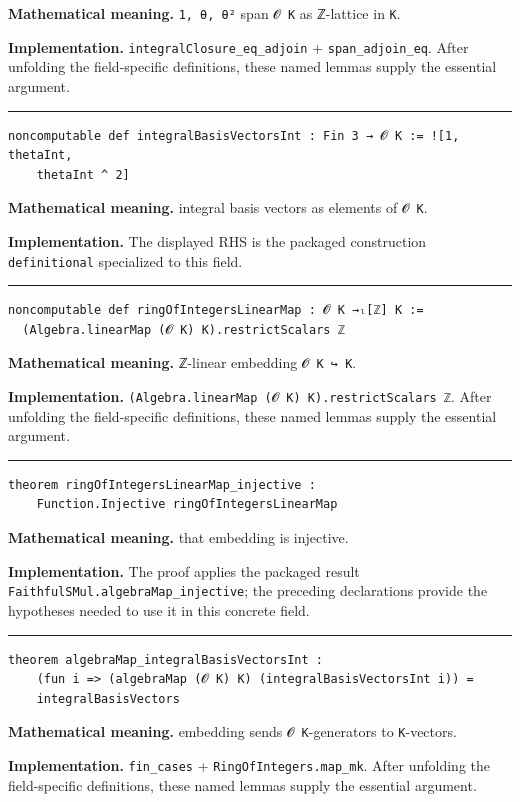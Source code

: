 \documentclass[UTF8,a4paper,11pt,fontset=fandol]{ctexart}
\theoremstyle{definition}
\newcommand{\statementsep}{\par\medskip\hrule\medskip}
\begin{document}
\noindent\textbf{Mathematical meaning.} \texttt{1, θ, θ²} span \texttt{𝓞 K} as ℤ-lattice in \texttt{K}.\par
\noindent\textbf{Implementation.} \texttt{integralClosure\_\allowbreak{}eq\_\allowbreak{}adjoin} + \texttt{span\_\allowbreak{}adjoin\_\allowbreak{}eq}. After unfolding the field-specific definitions, these named lemmas supply the essential argument.\par
\statementsep
\begin{verbatim}
noncomputable def integralBasisVectorsInt : Fin 3 → 𝓞 K := ![1, thetaInt,
    thetaInt ^ 2]
\end{verbatim}
\noindent\textbf{Mathematical meaning.} integral basis vectors as elements of \texttt{𝓞 K}.\par
\noindent\textbf{Implementation.} The displayed RHS is the packaged construction \texttt{definitional} specialized to this field.\par
\statementsep
\begin{verbatim}
noncomputable def ringOfIntegersLinearMap : 𝓞 K →ₗ[ℤ] K :=
  (Algebra.linearMap (𝓞 K) K).restrictScalars ℤ
\end{verbatim}
\noindent\textbf{Mathematical meaning.} ℤ-linear embedding \texttt{𝓞 K ↪ K}.\par
\noindent\textbf{Implementation.} \texttt{(Algebra.\allowbreak{}linearMap (𝓞 K) K).\allowbreak{}restrictScalars ℤ}. After unfolding the field-specific definitions, these named lemmas supply the essential argument.\par
\statementsep
\begin{verbatim}
theorem ringOfIntegersLinearMap_injective :
    Function.Injective ringOfIntegersLinearMap
\end{verbatim}
\noindent\textbf{Mathematical meaning.} that embedding is injective.\par
\noindent\textbf{Implementation.} The proof applies the packaged result \texttt{FaithfulSMul.\allowbreak{}algebraMap\_\allowbreak{}injective}; the preceding declarations provide the hypotheses needed to use it in this concrete field.\par
\statementsep
\begin{verbatim}
theorem algebraMap_integralBasisVectorsInt :
    (fun i => (algebraMap (𝓞 K) K) (integralBasisVectorsInt i)) =
    integralBasisVectors
\end{verbatim}
\noindent\textbf{Mathematical meaning.} embedding sends \texttt{𝓞 K}-generators to \texttt{K}-vectors.\par
\noindent\textbf{Implementation.} \texttt{fin\_\allowbreak{}cases} + \texttt{RingOfIntegers.\allowbreak{}map\_\allowbreak{}mk}. After unfolding the field-specific definitions, these named lemmas supply the essential argument.\par
\end{document}
